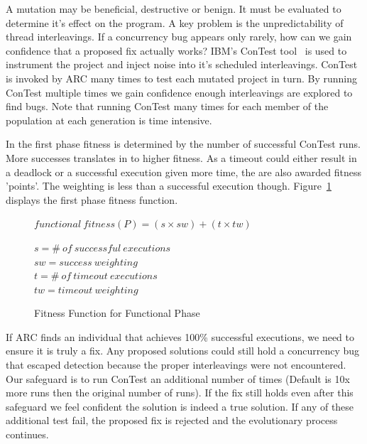 \documentclass{llncs}
\begin{document}
A mutation may be beneficial, destructive or benign. It must be evaluated to
determine it's effect on the program. A key problem is the unpredictability of
thread interleavings. If a concurrency bug appears only rarely, how can we gain
confidence that a proposed fix actually works? IBM's ConTest tool~\cite{EFN+02}
is used to instrument the project and inject noise into it's scheduled
interleavings. ConTest is invoked by ARC many times to test each mutated
project in turn. By running ConTest multiple times we gain confidence enough
interleavings are explored to find bugs. Note that running ConTest many times
for each member of the population at each generation is time intensive.

In the first phase fitness is determined by the number of successful ConTest
runs. More successes translates in to higher fitness. As a timeout could either
result in a deadlock or a successful execution given more time, the are also
awarded fitness 'points'. The weighting is less than a successful execution
though. Figure~\ref{fig:functional_fitness} displays the first phase fitness
function.

\begin{figure}
\begin{footnotesize}
\begin{center}
$functional\ fitness(P) = (s \times sw) + (t \times tw)$
\end{center}
\end{footnotesize}
\begin{tiny}
\begin{center}
$s = \#\ of\ successful\ executions$ \\
$sw = success\ weighting$ \\
$t = \#\ of\ timeout\ executions$ \\
$tw = timeout\ weighting$
\end{center}
\end{tiny}
\caption{Fitness Function for Functional Phase}
\label{fig:functional_fitness}
\end{figure}

If ARC finds an individual that achieves 100\% successful executions, we need
to ensure it is truly a fix. Any proposed solutions could still hold a
concurrency bug that escaped detection because the proper interleavings were
not encountered. Our safeguard is to run ConTest an additional number of times
(Default is 10x more runs then the original number of runs). If the fix still
holds even after this safeguard we feel confident the solution is indeed a true
solution. If any of these additional test fail, the proposed fix is rejected
and the evolutionary process continues.
\end{document}
